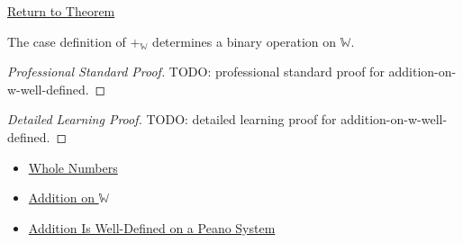 \newpage
{}
\label{prf:addition-on-w-well-defined}

\begin{remark*}[Return]
\hyperref[thm:addition-on-w-well-defined]{Return to Theorem}
\end{remark*}

\begin{theorem*}
The case definition of $+_{\mathbb{W}}$ determines a binary operation on
$\mathbb{W}$.
\end{theorem*}

\begin{proof}[Professional Standard Proof]
\LRAProofBodyStart
TODO: professional standard proof for addition-on-w-well-defined.
\end{proof}

\begin{proof}[Detailed Learning Proof]
\LRAProofBodyStart
TODO: detailed learning proof for addition-on-w-well-defined.
\end{proof}

\begin{remark*}
\end{remark*}

\begin{dependencies}
\begin{itemize}
  \item \hyperref[def:whole-numbers]{Whole Numbers}
  \item \hyperref[def:addition-on-w]{Addition on $\mathbb{W}$}
  \item \hyperref[thm:addition-well-defined-on-peano-system]{Addition Is Well-Defined on a Peano System}
\end{itemize}
\end{dependencies}

\clearpage
